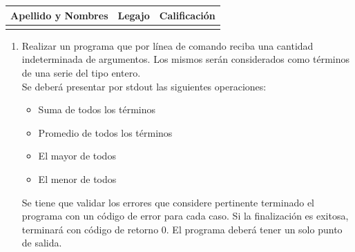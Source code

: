 \documentclass[12pt]{article} %
\begin{document}
\newpage
\noindent
  \begin{center}
   \begin{tabular}{| c | c | c |}
    \hline
     Apellido y Nombres \hspace{8cm} &  Legajo & {Calificación} \\ \hline 
      &	& \\ \hline
   \end{tabular}	
  \end{center}

\noindent



\begin{enumerate}
\item Realizar un programa que por línea de comando reciba una cantidad indeterminada de argumentos. Los mismos serán considerados como términos de una serie del tipo entero.\\
Se deberá presentar por {\color{blue}stdout} las siguientes operaciones:
\begin{itemize}
\item Suma de todos los términos
\item Promedio de todos los términos
\item El mayor de todos
\item El menor de todos
\end{itemize}
Se tiene que validar los errores que considere pertinente terminado el programa con un código de error para cada caso. Si la finalización es exitosa, terminará con código de retorno {\color{blue}0}.
El programa deberá tener un solo punto de salida. 


\end{enumerate}
 
\end{document}
